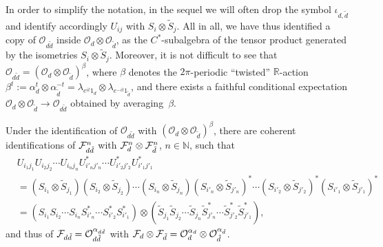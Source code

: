 \documentclass[12pt,a4paper]{amsart}
\numberwithin{equation}{section}
\theoremstyle{remark}
\newcommand{\ot}{\otimes}
\newcommand{\Rl}{\mathbb{R}}
\newcommand{\Nl}{\mathbb{N}}
\newcommand{\CO}[0]{\mathcal{O}} \newcommand{\CP}[0]{\mathcal{P}}
\begin{document}
In order to simplify the notation, in the sequel we will often drop the symbol $\iota_{d,\tilde d}$ and identify accordingly $U_{ij}$ with $S_i \otimes \tilde S_j$. All in all, we have thus identified a copy of $\CO_{d\tilde d}$ inside $\CO_d \otimes \CO_{\tilde d}$, as the $C^*$-subalgebra of the tensor product generated by the isometries $S_i \otimes \tilde S_j$. Moreover, it is not difficult to see that $\CO_{d\tilde d} = (\CO_d \otimes \CO_{\tilde d})^\beta$, where $\beta$ denotes the $2\pi$-periodic ``twisted'' $\Rl$-action $\beta^t := \alpha_d^t\otimes\alpha_{\tilde d}^{-t}=\lambda_{e^{it} 1_d}\ot\lambda_{e^{-it} 1_{\tilde d}}$\cite{Chambers:2014,Morgan:2017}, and there exists a faithful conditional expectation $\CO_d \otimes \CO_{\tilde d} \to \CO_{d\tilde d}$ obtained by averaging~$\beta$. 

Under the identification of $\CO_{d\tilde d}$ with $(\CO_d \otimes \CO_{\tilde d})^\beta$, there are coherent identifications of $\mathcal{F}_{d\tilde d}^n$ with $\mathcal{F}_d^n \otimes \mathcal{F}_{\tilde d}^n$, $n\in\Nl$, such that
\begin{align*}
	& U_{i_1 j_1}U_{i_2 j_2} \cdots U_{i_n j_n} U^*_{i'_n j'_n} \cdots U^*_{i'_2 j'_2} U^*_{i'_1 j'_1} 
	\\
	&=
	(S_{i_1} \otimes \tilde S_{j_1})(S_{i_2} \otimes \tilde S_{j_2}) \cdots (S_{i_n} \otimes \tilde S_{j_n})(S_{i'_n} \otimes \tilde S_{j'_n})^* \cdots (S_{i'_2} \otimes \tilde S_{j'_2})^*(S_{i'_1} \otimes \tilde S_{j'_1})^* 
	\\
	&= 
	(S_{i_1}S_{i_2} \cdots S_{i_n}S^*_{i'_n} \cdots S^*_{i'_2}S^*_{i'_1}) \otimes 
	(\tilde S_{j_1}\tilde S_{j_2} \cdots \tilde S_{j_n}\tilde S^*_{j'_n} \cdots \tilde S^*_{j'_2}\tilde S^*_{j'_1}), 
\end{align*}
and thus of $\CF_{d\tilde d}=\CO_{d\tilde d}^{\alpha_{d\tilde d}}$ with $\CF_d \otimes \CF_{\tilde d} = \CO_d^{\alpha_d} \otimes \CO_{\tilde d}^{\alpha_{\tilde d}}$.
\end{document}
